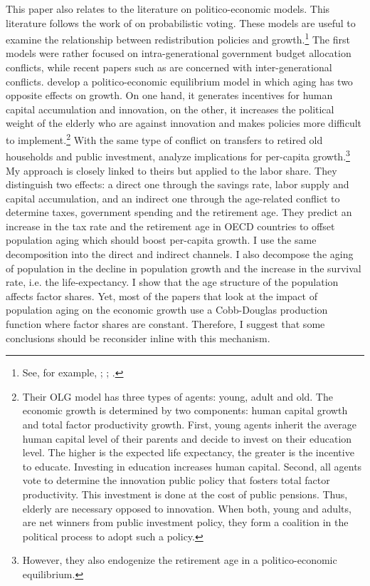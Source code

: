 This paper also relates to the literature on politico-economic models. This literature follows the work of \cite{Lindbeck1987} on probabilistic voting. These models are useful to examine the relationship between redistribution policies and growth.\footnote{See, for example, \cite{Alesina1994}; \cite{Persson1994}; \cite{Krusell1997}.} The first models were rather focused on intra-generational government budget allocation conflicts, while recent papers such as \cite{Lancia2012} are concerned with inter-generational conflicts. \cite{Lancia2012} develop a politico-economic equilibrium model in which aging has two opposite effects on growth. On one hand, it generates incentives for human capital accumulation and innovation, on the other, it increases the political weight of the elderly who are against innovation and makes policies more difficult to implement.\footnote{Their OLG model has three types of agents: young, adult and old. The economic growth is determined by two components: human capital growth and total factor productivity growth. First, young agents inherit the average human capital level of their parents and decide to invest on their education level. The higher is the expected life expectancy, the greater is the incentive to educate. Investing in education increases human capital. Second, all agents vote to determine the innovation public policy that fosters total factor productivity. This investment is done at the cost of public pensions. Thus, elderly are necessary opposed to innovation. When both, young and adults, are net winners from public investment policy, they form a coalition in the political process to adopt such a policy.} 
With the same type of conflict on transfers to retired old households and public investment, \cite{Gonzalez-Eiras2012} analyze implications for per-capita growth.\footnote{However, they also endogenize the retirement age in a politico-economic equilibrium.} My approach is closely linked to theirs but applied to the labor share. They distinguish two effects: a direct one through the savings rate, labor supply and capital accumulation, and an indirect one through the age-related conflict to determine taxes, government spending and the retirement age. They predict an increase in the tax rate and the retirement age in OECD countries to offset population aging which should boost per-capita growth. I use the same decomposition into the direct and indirect channels. I also decompose the aging of population in the decline in population growth and the increase in the survival rate, i.e. the life-expectancy.
I show that the age structure of the population affects factor shares. Yet, most of the papers that look at the impact of population aging on the economic growth use a Cobb-Douglas production function where factor shares are constant. Therefore, I suggest that some conclusions should be reconsider inline with this mechanism.

